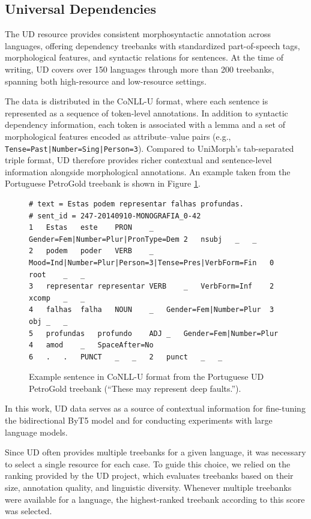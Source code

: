 \subsection{Universal Dependencies}

The \ac{UD} resource provides consistent morphosyntactic annotation across languages, offering dependency treebanks with standardized part-of-speech tags, morphological features, and syntactic relations for sentences. At the time of writing, \ac{UD} covers over 150 languages through more than 200 treebanks, spanning both high-resource and low-resource settings.

The data is distributed in the CoNLL-U format, where each sentence is represented as a sequence of token-level annotations. In addition to syntactic dependency information, each token is associated with a lemma and a set of morphological features encoded as attribute–value pairs (e.g., \texttt{Tense=Past|Number=Sing|Person=3}). Compared to UniMorph's tab-separated triple format, \ac{UD} therefore provides richer contextual and sentence-level information alongside morphological annotations. An example taken from the Portuguese PetroGold treebank is shown in Figure \ref{fig:ud-conllu-example}.

\begin{figure}[h]
\centering
\begin{BVerbatim}[fontsize=\footnotesize,tabsize=1]
# text = Estas podem representar falhas profundas.
# sent_id = 247-20140910-MONOGRAFIA_0-42
1	Estas	este	PRON	_	Gender=Fem|Number=Plur|PronType=Dem	2	nsubj	_	_
2	podem	poder	VERB	_	Mood=Ind|Number=Plur|Person=3|Tense=Pres|VerbForm=Fin	0	root	_	_
3	representar	representar	VERB	_	VerbForm=Inf	2	xcomp	_	_
4	falhas	falha	NOUN	_	Gender=Fem|Number=Plur	3	obj	_	_
5	profundas	profundo	ADJ	_	Gender=Fem|Number=Plur	4	amod	_	SpaceAfter=No
6	.	.	PUNCT	_	_	2	punct	_	_
\end{BVerbatim}
\caption{Example sentence in CoNLL-U format from the Portuguese UD PetroGold treebank (``These may represent deep faults.'').}
\label{fig:ud-conllu-example}
\end{figure}

In this work, \ac{UD} data serves as a source of contextual information for fine-tuning the bidirectional ByT5 model and for conducting experiments with large language models.

Since \ac{UD} often provides multiple treebanks for a given language, it was necessary to select a single resource for each case. To guide this choice, we relied on the ranking provided by the \ac{UD} project, which evaluates treebanks based on their size, annotation quality, and linguistic diversity. Whenever multiple treebanks were available for a language, the highest-ranked treebank according to this score was selected.

